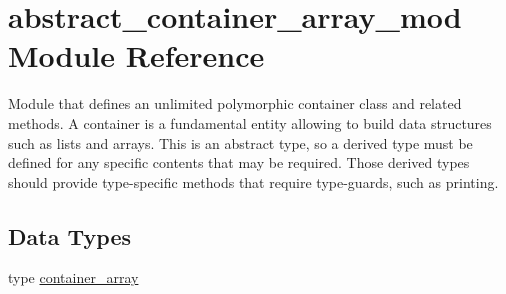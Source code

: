 \hypertarget{namespaceabstract__container__array__mod}{}\section{abstract\+\_\+container\+\_\+array\+\_\+mod Module Reference}
\label{namespaceabstract__container__array__mod}


Module that defines an unlimited polymorphic container class and related methods. A container is a fundamental entity allowing to build data structures such as lists and arrays. This is an abstract type, so a derived type must be defined for any specific contents that may be required. Those derived types should provide type-\/specific methods that require type-\/guards, such as printing.  


\subsection*{Data Types}
\begin{DoxyCompactItemize}
\item 
type \hyperlink{structabstract__container__array__mod_1_1container__array}{container\+\_\+array}
\end{DoxyCompactItemize}
